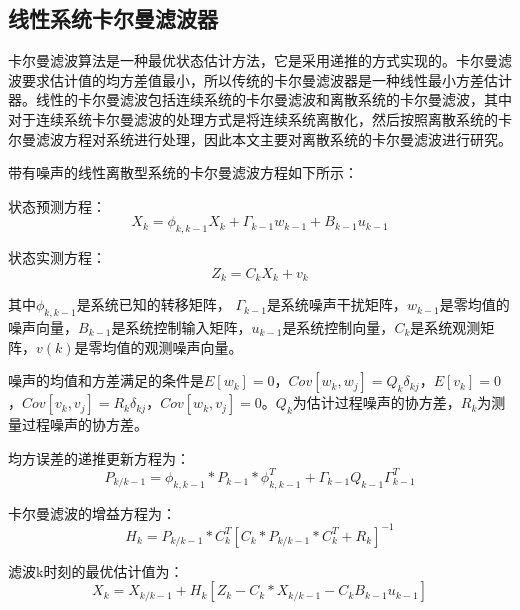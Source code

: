 \subsection{线性系统卡尔曼滤波器}
卡尔曼滤波算法是一种最优状态估计方法，它是采用递推的方式实现的。卡尔曼滤波要求估计值的均方差值最小，所以传统的卡尔曼滤波器是一种线性最小方差估计器。线性的卡尔曼滤波包括连续系统的卡尔曼滤波和离散系统的卡尔曼滤波，其中对于连续系统卡尔曼滤波的处理方式是将连续系统离散化，然后按照离散系统的卡尔曼滤波方程对系统进行处理，因此本文主要对离散系统的卡尔曼滤波进行研究。

带有噪声的线性离散型系统的卡尔曼滤波方程如下所示：

状态预测方程：
\begin{equation}
{{X}_{k}}={{\phi }_{k,k-1}}{{X}_{k}}+{{\Gamma }_{k-1}}{{w}_{k-1}}+{{B}_{k-1}}{{u}_{k-1}}
\end{equation}

状态实测方程：
\begin{equation}
{{Z}_{k}}={{C}_{k}}{{X}_{k}}+{{v}_{k}}
\end{equation}

其中${{\phi }_{k,k-1}}$是系统已知的转移矩阵， ${{\Gamma }_{k-1}}$是系统噪声干扰矩阵，${{w}_{k-1}}$是零均值的噪声向量，${{B}_{k-1}}$是系统控制输入矩阵，${{u}_{k-1}}$是系统控制向量，${{C}_{k}}$是系统观测矩阵，$v(k)$是零均值的观测噪声向量。

噪声的均值和方差满足的条件是$E\left[ {{w}_{k}} \right]=0$，$Cov\left[ {{w}_{k}},{{w}_{j}} \right]={{Q}_{k}}{{\delta }_{kj}}$，$E\left[ {{v}_{k}} \right]=0$，$Cov\left[ {{v}_{k}},{{v}_{j}} \right]={{R}_{k}}{{\delta }_{kj}}$，$Cov\left[ {{w}_{k}},{{v}_{j}} \right]=0$。${{Q}_{k}}$为估计过程噪声的协方差，${{R}_{k}}$为测量过程噪声的协方差。


均方误差的递推更新方程为：
\begin{equation}
{{P}_{k/k-1}}={{\phi }_{k,k-1}}*{{P}_{k-1}}*\phi _{k,k-1}^{T}+{{\Gamma }_{k-1}}{{Q}_{k-1}}\Gamma _{k-1}^{T}
\end{equation}

卡尔曼滤波的增益方程为：
\begin{equation}
{{H}_{k}}={{P}_{k/k-1}}*C_{k}^{T}{{\left[ {{C}_{k}}*{{P}_{k/k-1}}*C_{k}^{T}+{{R}_{k}} \right]}^{-1}}
\end{equation}

滤波k时刻的最优估计值为：
\begin{equation}
{{X}_{k}}={{X}_{k/k-1}}+{{H}_{k}}\left[ {{Z}_{k}}-{{C}_{k}}*{{X}_{k/k-1}}-{{C}_{k}}{{B}_{k-1}}{{u}_{k-1}} \right]
\end{equation}

